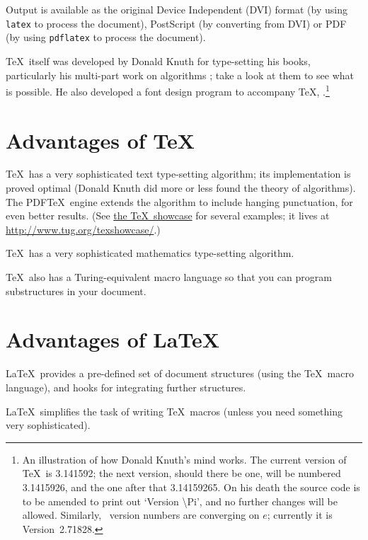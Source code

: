 \documentclass[authoryearcitations]{UoYCSproject}
\begin{document}
Output is available as the original Device Independent (DVI) format
(by using \lstinline|latex| to process the document), PostScript (by
converting from DVI) or PDF (by using \lstinline|pdflatex| to process
the document).

\TeX\ itself was developed by Donald Knuth for type-setting his books,
particularly his multi-part work on algorithms
\citep{Knuth1997,Knuth1998a,Knuth1998b}; take a look at them to see
what is possible.  He also developed a font design program to
accompany \TeX, \MF.\footnote{An illustration of how Donald Knuth's
  mind works.  The current version of \TeX\ is 3.141592; the next
  version, should there be one, will be numbered 3.1415926, and the
  one after that 3.14159265.  On his death the source code is to be
  amended to print out `Version \textbackslash Pi', and no further
  changes will be allowed.  Similarly, \MF\ version numbers are
  converging on \begin{math}e\end{math}; currently it is
  Version~2.71828.}

\section{Advantages of \TeX}
\label{sec:advantagesoftex}

\TeX\ has a very sophisticated text type-setting algorithm; its
implementation is proved optimal (Donald Knuth did more or less found
the theory of algorithms).  The PDF\TeX\ engine extends the algorithm
to include hanging punctuation, for even better results.  (See
\href{http://www.tug.org/texshowcase/}{the \TeX\ showcase} for several
examples; it lives at \url{http://www.tug.org/texshowcase/}.)

\TeX\ has a very sophisticated mathematics type-setting algorithm.

\TeX\ also has a Turing-equivalent macro language so that you can
program substructures in your document.

\section{Advantages of \LaTeX}
\label{sec:advantagesoflatex}

\LaTeX\ provides a pre-defined set of document structures (using the
\TeX\ macro language), and hooks for integrating further structures.

\LaTeX\ simplifies the task of writing \TeX\ macros (unless you need
something very sophisticated).
\end{document}

